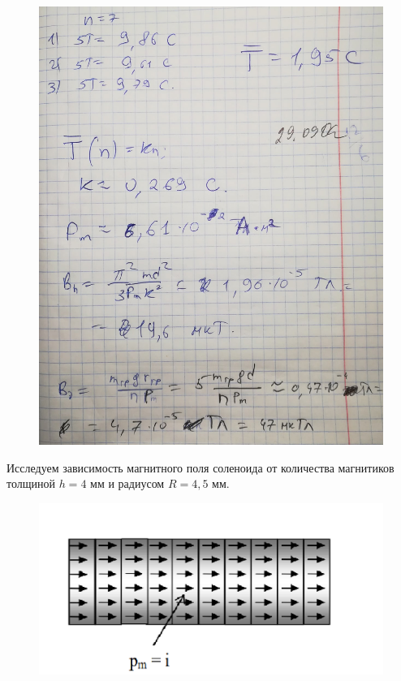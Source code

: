 \documentclass[a4paper,12pt]{article} %
\begin{document}
\newpage
\begin{figure}[h!]
	\centering
	\includegraphics[scale=0.32]{Pictures/sign.jpg}
\end{figure}
Исследуем зависимость магнитного поля соленоида от количества магнитиков толщиной $h = 4$ мм и радиусом $R = 4,5$ мм.

\begin{figure}[h!]
	\centering
	\includegraphics[scale=0.7]{Pictures/Цил.png}
\end{figure}
\end{document}
